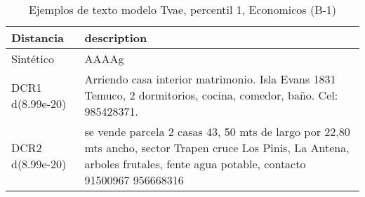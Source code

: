 \begin{table}[H]
\centering
\fontsize{10}{14}\selectfont
\caption{Ejemplos de texto modelo Tvae, percentil 1, Economicos (B-1)}
\label{table-example-economicos-b-1-tvae-1p-text}
\begin{tabular}{|l|m{35em}|}
\hline
\rowcolor[gray]{0.8}
Distancia & description \\
\hline Sintético & AAAAg \\
\hline DCR1 d(8.99e-20) & Arriendo casa interior matrimonio. Isla Evans 1831 Temuco, 2 dormitorios, cocina, comedor, ba\~no. Cel: 985428371. \\
\hline DCR2 d(8.99e-20) & se vende parcela 2 casas 43, 50 mts de largo por 22,80 mts ancho, sector Trapen cruce Los Pinis, La Antena, arboles frutales, fente agua potable, contacto 91500967 956668316 \\
\hline
\end{tabular}
\end{table}
